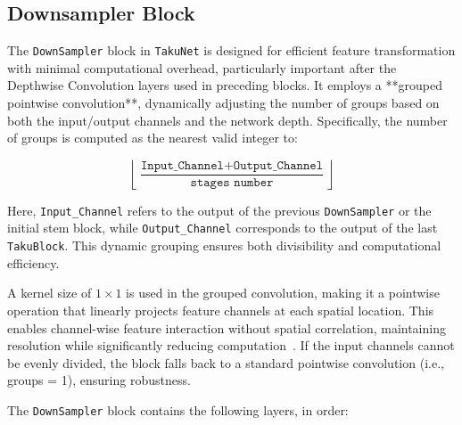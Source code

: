 \subsection{Downsampler Block}

The \texttt{DownSampler} block in \texttt{TakuNet} is designed for efficient feature transformation with minimal computational overhead, particularly important after the Depthwise Convolution layers used in preceding blocks. It employs a **grouped pointwise convolution**, dynamically adjusting the number of groups based on both the input/output channels and the network depth. Specifically, the number of groups is computed as the nearest valid integer to:

\[
\left\lfloor \frac{\texttt{Input\_Channel} + \texttt{Output\_Channel}}{\texttt{stages number}} \right\rfloor
\]

Here, \texttt{Input\_Channel} refers to the output of the previous \texttt{DownSampler} or the initial stem block, while \texttt{Output\_Channel} corresponds to the output of the last \texttt{TakuBlock}. This dynamic grouping ensures both divisibility and computational efficiency.

A kernel size of \(1 \times 1\) is used in the grouped convolution, making it a pointwise operation that linearly projects feature channels at each spatial location. This enables channel-wise feature interaction without spatial correlation, maintaining resolution while significantly reducing computation~\cite{PointwiseGroupedCon}. 
If the input channels cannot be evenly divided, the block falls back to a standard pointwise convolution (i.e., groups = 1), ensuring robustness.

The \texttt{DownSampler} block contains the following layers, in order:

